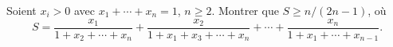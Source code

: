 Soient $x_i > 0$ avec $x_1 + \cdots + x_n = 1$, $n \geq 2$. Montrer que $S \geq n/(2n - 1)$, où
\[ S = \frac{x_1}{1 + x_2 + \cdots + x_n} + \frac{x_2}{1 + x_1 + x_3 + \cdots + x_n} + \cdots + \frac{x_n}{1 + x_1 + \cdots + x_{n-1}}. \]
